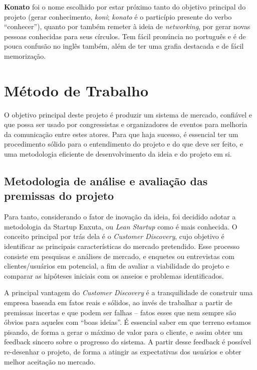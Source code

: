 \documentclass[12pt,a4paper,twoside,hyphens,english,brazil]{abntex2}
\begin{document}
\textbf{Konato} foi o nome escolhido por estar próximo tanto do objetivo principal do projeto (gerar conhecimento, \emph{koni}; \emph{konato} é o particípio presente do verbo ``conhecer''), quanto por também remeter à ideia de \emph{networking}, por gerar novas pessoas conhecidas para seus círculos. Tem fácil pronúncia no português e é de pouca confusão no inglês também, além de ter uma grafia destacada e de fácil memorização.


\section{Método de Trabalho}
O objetivo principal deste projeto é produzir um sistema de mercado, confiável e que possa ser usado por congressistas e organizadores de eventos para melhoria da comunicação entre estes atores. Para que haja sucesso, é essencial ter um procedimento sólido para o entendimento do projeto e do que deve ser feito, e uma metodologia eficiente de desenvolvimento da ideia e do projeto em si.

\subsection{Metodologia de análise e avaliação das premissas do projeto}
Para tanto, considerando o fator de inovação da ideia, foi decidido adotar a metodologia da Startup Enxuta, ou \emph{Lean Startup} como é mais conhecida. O conceito principal por trás dela é o \emph{Customer Discovery}\cite{manual-startup}, cujo objetivo é identificar as principais características do mercado pretendido. Esse processo consiste em pesquisas e análises de mercado, e enquetes ou entrevistas com clientes/usuários em potencial, a fim de avaliar a viabilidade do projeto e comparar as hipóteses iniciais com os anseios e problemas identificados.

A principal vantagem do \emph{Customer Discovery} é a tranquilidade de construir uma empresa baseada em fatos reais e sólidos, ao invés de trabalhar a partir de premissas incertas e que podem ser falhas -- fatos esses que nem sempre são óbvios para aqueles com ``boas ideias''. É essencial saber em que terreno estamos pisando, de forma a gerar o máximo de valor para o cliente, e assim obter um feedback sincero sobre o progresso do sistema. A partir desse feedback é possível re-desenhar o projeto, de forma a atingir as expectativas dos usuários e obter melhor aceitação no mercado.
\end{document}
